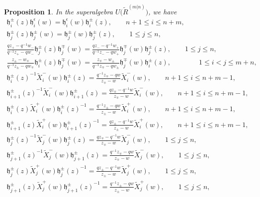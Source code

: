 \documentclass[10pt,a4paper]{amsart}
\numberwithin{equation}{section}
\newtheorem{Proposition}[Theorem]{Proposition}
 { \theoremstyle{definition}
\newtheorem{Definition}[Theorem]{Definition}
\newtheorem{Note}[Theorem]{Note}
\newtheorem{Example}[Theorem]{Example}
\newtheorem{Remark}[Theorem]{Remark} }
\begin{document}
\begin{Proposition} In the superalgebra $U\bigl(\widetilde{R}^{(m|n)}\bigr)$, we have
\begin{gather*}
 \mathfrak{h}_i^{\pm}(z)\mathfrak{h}_i^{\epsilon}(w)=\mathfrak{h}_i^{\epsilon}(w)\mathfrak{h}_i^{\pm}(z),\qquad n+1\leq i\leq n+m,\\
 \mathfrak{h}_j^{\pm}(z)\mathfrak{h}_j^{\pm}(w)=\mathfrak{h}_j^{\pm}(w)\mathfrak{h}_j^{\pm}(z),\qquad 1\leq j\leq n,\\
 \frac{qz_+-q^{-1}w_-}{q^{-1}z_+-qw_-}\mathfrak{h}_j^{\pm}(z)\mathfrak{h}_j^{\mp}(w)=\frac{qz_--q^{-1}w_+}{q^{-1}z_--qw_+}\mathfrak{h}_j^{\mp}(w)\mathfrak{h}_j^{\pm}(z),\qquad 1\leq j\leq n,\\
 \frac{z_{\pm}-w_{\mp}}{q^{-1}z_{\pm}-qw_{\mp}}\mathfrak{h}_i^{\pm}(z)\mathfrak{h}_j^{\mp}(w)=\frac{z_{\mp}-w_{\pm}}{q^{-1}z_{\mp}-qw_{\pm}}\mathfrak{h}_j^{\mp}(w)\mathfrak{h}_i^{\pm}(z), \qquad \qquad 1\leq i<j\leq m+n,\\
 {\mathfrak{h}_i^{\pm}(z)}^{-1}\widetilde{X}^-_i(w)\mathfrak{h}_i^{\pm}(z)=\frac{q^{-1}z_{\mp}-qw}{z_{\mp}-w}\widetilde{X}^-_i(w),\qquad n+1\leq i\leq n+m-1,\\
 {\mathfrak{h}_{i+1}^{\pm}(z)}^{-1}\widetilde{X}^-_i(w)\mathfrak{h}_{i+1}^{\pm}(z)=\frac{qz_{\mp}-q^{-1}w}{z_{\mp}-w}\widetilde{X}^-_i(w),\qquad n+1\leq i\leq n+m-1,\\
 \mathfrak{h}_i^{\pm}(z)\widetilde{X}^+_i(w){\mathfrak{h}_i^{\pm}(z)}^{-1}=\frac{q^{-1}z_{\pm}-qw}{z_{\pm}-w}\widetilde{X}^+_i(w),\qquad n+1\leq i\leq n+m-1,\\
 \mathfrak{h}_{i+1}^{\pm}(z)\widetilde{X}^+_i(w){\mathfrak{h}_{i+1}^{\pm}(z)}^{-1}=\frac{qz_{\pm}-q^{-1}w}{z_{\pm}-w}\widetilde{X}^+_i(w),\qquad n+1\leq i\leq n+m-1,\\
 {\mathfrak{h}_j^{\pm}(z)}^{-1}\widetilde{X}^-_j(w)\mathfrak{h}_j^{\pm}(z)=\frac{qz_{\mp}-q^{-1}w}{z_{\mp}-w}\widetilde{X}^-_j(w),\qquad 1\leq j\leq n,\\
 {\mathfrak{h}_{j+1}^{\pm}(z)}^{-1}\widetilde{X}^-_j(w)\mathfrak{h}_{j+1}^{\pm}(z)=\frac{q^{-1}z_{\mp}-qw}{z_{\mp}-w}\widetilde{X}^-_j(w),\qquad 1\leq j\leq n,
\\
 \mathfrak{h}_j^{\pm}(z)\widetilde{X}^+_j(w){\mathfrak{h}_j^{\pm}(z)}^{-1}=\frac{qz_{\pm}-q^{-1}w}{z_{\pm}-w}\widetilde{X}^+_j(w),\qquad 1\leq j\leq n,\\
 \mathfrak{h}_{j+1}^{\pm}(z)\widetilde{X}^+_j(w){\mathfrak{h}_{j+1}^{\pm}(z)}^{-1}=\frac{q^{-1}z_{\pm}-qw}{z_{\pm}-w}\widetilde{X}^+_j(w),\qquad 1\leq j\leq n,\\

\end{gather*}
\end{Proposition}
\end{document}
